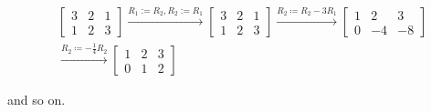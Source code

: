 \documentclass[12pt]{article}
\begin{document}
\[
  \begin{align}
    &\begin{bmatrix}
      3 & 2 & 1 \\
      1 & 2 & 3
    \end{bmatrix}
    \xrightarrow{R_1 := R_2, R_2 := R_1}
    \begin{bmatrix}
      3 & 2 & 1 \\
      1 & 2 & 3
    \end{bmatrix}
    \xrightarrow{R_2\coloneqq R_{2}-3R_1}
    \begin{bmatrix}
      1 & 2 & 3 \\
      0 & -4 & -8
    \end{bmatrix}\\
    &\xrightarrow{R_2\coloneqq -\frac{1}{4}R_2}
    \begin{bmatrix}
      1 & 2 & 3 \\
      0 & 1 & 2
    \end{bmatrix}
  \end{align}
\]

and so on.
\end{document}
